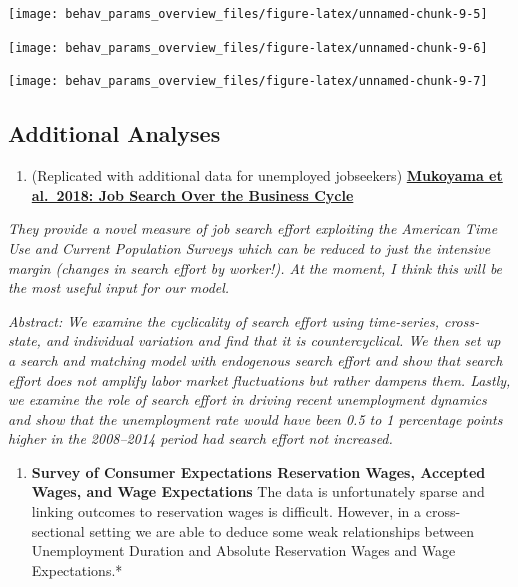\documentclass[
]{article}
\providecommand{\tightlist}{%
  \setlength{\itemsep}{0pt}\setlength{\parskip}{0pt}}
\begin{document}
\begin{center}\texttt{[image: behav\_params\_overview\_files/figure-latex/unnamed-chunk-9-5]} \end{center}

\begin{center}\texttt{[image: behav\_params\_overview\_files/figure-latex/unnamed-chunk-9-6]} \end{center}

\begin{center}\texttt{[image: behav\_params\_overview\_files/figure-latex/unnamed-chunk-9-7]} \end{center}

\subsection{Additional Analyses}\label{additional-analyses}

\begin{enumerate}
\def\labelenumi{\arabic{enumi}.}
\tightlist
\item
  (Replicated with additional data for unemployed jobseekers)
  \href{https://www.aeaweb.org/articles?id=10.1257/mac.20160202}{\textbf{Mukoyama
  et al.~2018: Job Search Over the Business Cycle}}
\end{enumerate}

\emph{They provide a novel measure of job search effort exploiting the
American Time Use and Current Population Surveys which can be reduced to
just the intensive margin (changes in search effort by worker!). At the
moment, I think this will be the most useful input for our model.}

\emph{Abstract: We examine the cyclicality of search effort using
time-series, cross-state, and individual variation and find that it is
countercyclical. We then set up a search and matching model with
endogenous search effort and show that search effort does not amplify
labor market fluctuations but rather dampens them. Lastly, we examine
the role of search effort in driving recent unemployment dynamics and
show that the unemployment rate would have been 0.5 to 1 percentage
points higher in the 2008--2014 period had search effort not increased.}

\begin{enumerate}
\def\labelenumi{\arabic{enumi}.}
\setcounter{enumi}{3}
\tightlist
\item
  \textbf{Survey of Consumer Expectations Reservation Wages, Accepted
  Wages, and Wage Expectations} The data is unfortunately sparse and
  linking outcomes to reservation wages is difficult. However, in a
  cross-sectional setting we are able to deduce some weak relationships
  between Unemployment Duration and Absolute Reservation Wages and Wage
  Expectations.*
\end{enumerate}
\end{document}
